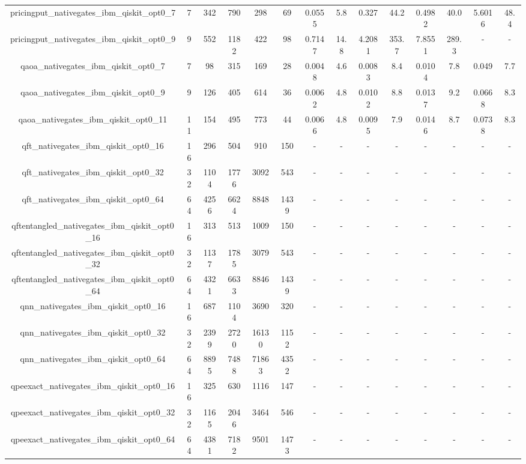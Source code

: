 \begin{table}[htb]
{\begin{tabular}{|c|c|c|c|c|c|c|c|c|c|c|c|c|c|}
pricingput\_nativegates\_ibm\_qiskit\_opt0\_7 & 7 & 342 & 790 & 298 & 69 & 0.0555 & 5.8 & 0.327 & 44.2 & 0.4982 & 40.0 & 5.6016 & 48.4 \\ 
pricingput\_nativegates\_ibm\_qiskit\_opt0\_9 & 9 & 552 & 1182 & 422 & 98 & 0.7147 & 14.8 & 4.2081 & 353.7 & 7.8551 & 289.3 & - & - \\ 
qaoa\_nativegates\_ibm\_qiskit\_opt0\_7 & 7 & 98 & 315 & 169 & 28 & 0.0048 & 4.6 & 0.0083 & 8.4 & 0.0104 & 7.8 & 0.049 & 7.7 \\ 
qaoa\_nativegates\_ibm\_qiskit\_opt0\_9 & 9 & 126 & 405 & 614 & 36 & 0.0062 & 4.8 & 0.0102 & 8.8 & 0.0137 & 9.2 & 0.0668 & 8.3 \\ 
qaoa\_nativegates\_ibm\_qiskit\_opt0\_11 & 11 & 154 & 495 & 773 & 44 & 0.0066 & 4.8 & 0.0095 & 7.9 & 0.0146 & 8.7 & 0.0738 & 8.3 \\ 
qft\_nativegates\_ibm\_qiskit\_opt0\_16 & 16 & 296 & 504 & 910 & 150 & - & - & - & - & - & - & - & - \\ 
qft\_nativegates\_ibm\_qiskit\_opt0\_32 & 32 & 1104 & 1776 & 3092 & 543 & - & - & - & - & - & - & - & - \\ 
qft\_nativegates\_ibm\_qiskit\_opt0\_64 & 64 & 4256 & 6624 & 8848 & 1439 & - & - & - & - & - & - & - & - \\ 
qftentangled\_nativegates\_ibm\_qiskit\_opt0\_16 & 16 & 313 & 513 & 1009 & 150 & - & - & - & - & - & - & - & - \\ 
qftentangled\_nativegates\_ibm\_qiskit\_opt0\_32 & 32 & 1137 & 1785 & 3079 & 543 & - & - & - & - & - & - & - & - \\ 
qftentangled\_nativegates\_ibm\_qiskit\_opt0\_64 & 64 & 4321 & 6633 & 8846 & 1439 & - & - & - & - & - & - & - & - \\ 
qnn\_nativegates\_ibm\_qiskit\_opt0\_16 & 16 & 687 & 1104 & 3690 & 320 & - & - & - & - & - & - & - & - \\ 
qnn\_nativegates\_ibm\_qiskit\_opt0\_32 & 32 & 2399 & 2720 & 16130 & 1152 & - & - & - & - & - & - & - & - \\ 
qnn\_nativegates\_ibm\_qiskit\_opt0\_64 & 64 & 8895 & 7488 & 71863 & 4352 & - & - & - & - & - & - & - & - \\ 
qpeexact\_nativegates\_ibm\_qiskit\_opt0\_16 & 16 & 325 & 630 & 1116 & 147 & - & - & - & - & - & - & - & - \\ 
qpeexact\_nativegates\_ibm\_qiskit\_opt0\_32 & 32 & 1165 & 2046 & 3464 & 546 & - & - & - & - & - & - & - & - \\ 
qpeexact\_nativegates\_ibm\_qiskit\_opt0\_64 & 64 & 4381 & 7182 & 9501 & 1473 & - & - & - & - & - & - & - & - \\ 

\end{tabular}}
\end{table}
